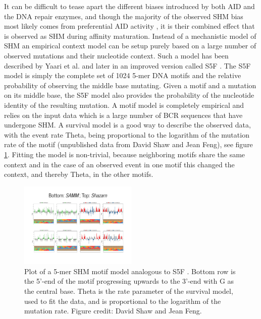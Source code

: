 It can be difficult to tease apart the different biases introduced by both AID and the DNA repair enzymes, and though the majority of the observed SHM bias most likely comes from preferential AID activity \cite{Pham_2016}, it is their combined effect that is observed as SHM during affinity maturation.
Instead of a mechanistic model of SHM an empirical context model can be setup purely based on a large number of observed mutations and their nucleotide context.
Such a model has been described by Yaari et al. \cite{yaari2013models} and later in an improved version called S5F \cite{cui2016model}.
The S5F model is simply the complete set of 1024 5-mer DNA motifs and the relative probability of observing the middle base mutating.
Given a motif and a mutation on its middle base, the S5F model also provides the probability of the nucleotide identity of the resulting mutation.
A motif model is completely empirical and relies on the input data which is a large number of BCR sequences that have undergone SHM.
A survival model \cite{cox1992regression} is a good way to describe the observed data, with the event rate Theta, being proportional to the logarithm of the mutation rate of the motif (unpublished data from David Shaw and Jean Feng), see figure \ref{fig:SAMM_plot}.
Fitting the model is non-trivial, because neighboring motifs share the same context and in the case of an observed event in one motif this changed the context, and thereby Theta, in the other motifs.

\begin{figure}
    \centering
    \includegraphics[width=0.5\textwidth]{figures/SAMM_plot.pdf}
    \caption{
        \label{fig:SAMM_plot}
        Plot of a 5-mer SHM motif model analogous to S5F \cite{cui2016model}. Bottom row is the 5'-end of the motif progressing upwards to the 3'-end with G as the central base. Theta is the rate parameter of the survival model, used to fit the data, and is proportional to the logarithm of the mutation rate.
        Figure credit: David Shaw and Jean Feng.
    }
\end{figure}











